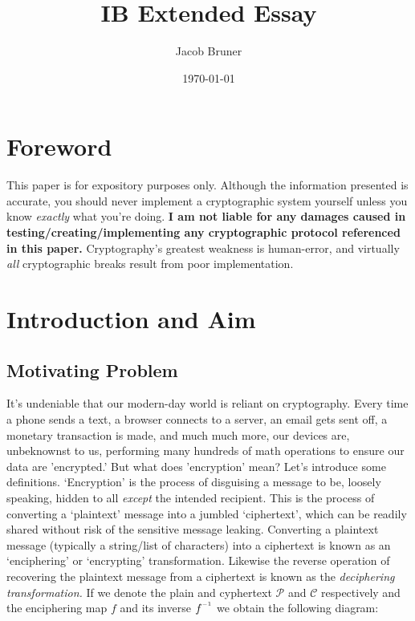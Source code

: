 \documentclass[11pt,a4paper]{article}
\author{Jacob Bruner}
\title{IB Extended Essay}
\date{\today}
\newcommand{\inv}{^{\raisebox{.2em}{$\scriptscriptstyle-1$}}}
\begin{document}
\maketitle
\tableofcontents

\pagebreak

\section*{Foreword}

This paper is for expository purposes only. Although the information presented is accurate, you should never implement a cryptographic system yourself unless you know \textit{\emph{exactly}} what you're doing. \textbf{I am not liable for any damages caused in testing/creating/implementing any cryptographic protocol referenced in this paper.} Cryptography's greatest weakness is human-error, and virtually \textit{all} cryptographic breaks result from poor implementation. 

\section{Introduction and Aim}
\subsection{Motivating Problem}
It's undeniable that our modern-day world is reliant on cryptography. Every time a phone sends a text, a browser connects to a server, an email gets sent off, a monetary transaction is made, and much much more, our devices are, unbeknownst to us, performing many hundreds of math operations to ensure our data are 'encrypted.' 
But what does 'encryption' mean? Let's introduce some definitions. ‘Encryption’ is the process of disguising a message to be, loosely speaking, hidden to all \textit{except} the intended recipient. This is the process of converting a ‘plaintext’ message into a jumbled ‘ciphertext’, which can be readily shared without risk of the sensitive message leaking. Converting a plaintext message (typically a string/list of characters) into a ciphertext is known as an ‘enciphering’ or ‘encrypting’ transformation. Likewise the reverse operation of recovering the plaintext message from a ciphertext is known as the \textit{deciphering transformation.}\autocite[54]{koblitz} If we denote the plain and cyphertext $\mathcal{P}$ and $\mathcal{C}$ respectively and the enciphering map $f$ and its inverse $f\inv$ we obtain the following diagram:
\end{document}
